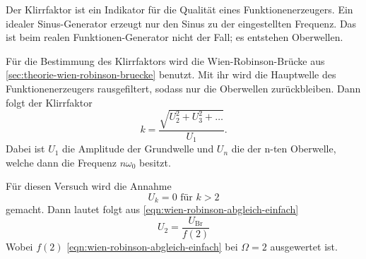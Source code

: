 Der Klirrfaktor ist ein Indikator für die Qualität eines Funktionenerzeugers. Ein idealer 
Sinus-Generator erzeugt nur den Sinus zu der eingestellten Frequenz. Das ist beim realen 
Funktionen-Generator nicht der Fall; es entstehen Oberwellen.

Für die Bestimmung des Klirrfaktors wird die Wien-Robinson-Brücke aus 
\autoref{sec:theorie-wien-robinson-bruecke} benutzt. Mit ihr wird die Hauptwelle des 
Funktionenerzeugers rausgefiltert, sodass nur die Oberwellen zurückbleiben. Dann folgt der
Klirrfaktor
\begin{equation}
	k = \frac{\sqrt{U_2^2 + U_3^2 + \hdots}}{U_1}.
	\label{eqn:klirrfaktor}
\end{equation}
Dabei ist $U_1$ die Amplitude der Grundwelle und $U_n$ die der n-ten Oberwelle, welche dann die
Frequenz $n\omega_0$ besitzt.

Für diesen Versuch wird die Annahme 
\begin{equation}
	U_k = 0 \text{ für } k > 2
	\label{eqn:klirrfaktor-annahme}
\end{equation}
gemacht. Dann lautet folgt aus \autoref{eqn:wien-robinson-abgleich-einfach}
\begin{equation}
	U_2 = \frac{U_\text{Br}}{f(2)}
	\label{eqn:klirrfaktor-u2}
\end{equation}
Wobei $f(2)$ \autoref{eqn:wien-robinson-abgleich-einfach} bei $\Omega = 2$ ausgewertet ist.

